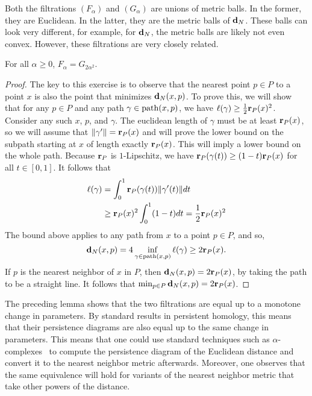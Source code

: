     Both the filtrations $(F_\alpha)$ and $(G_\alpha)$ are unions of metric balls.
    In the former, they are Euclidean.
    In the latter, they are the metric balls of $\mathbf{d}_N$.
    These balls can look very different, for example, for $\mathbf{d}_N$, the metric balls are likely not even convex.
    However, these filtrations are very closely related.
    \begin{lemma}
      For all $\alpha \ge 0$, $F_\alpha = G_{2\alpha^2}$.
    \end{lemma}
    \begin{proof}
      The key to this exercise is to observe that the nearest point $p \in P$ to a point $x$ is also the point that minimizes $\mathbf{d}_N(x,p)$.
      To prove this, we will show that for any $p\in P$ and any path $\gamma\in \mathrm{path}(x,p)$, we have $\ell(\gamma)\ge \frac{1}{2}\mathbf{r}_P(x)^2$.
      Consider any such $x$, $p$, and $\gamma$.
      The euclidean length of $\gamma$ must be at least $\mathbf{r}_P(x)$, so we will assume that $\|\gamma'\| = \mathbf{r}_P(x)$ and will prove the lower bound on the subpath starting at $x$ of length exactly $\mathbf{r}_P(x)$.
      This will imply a lower bound on the whole path.
      Because $\mathbf{r}_P$ is $1$-Lipschitz, we have $\mathbf{r}_P(\gamma(t))\ge (1-t)\mathbf{r}_P(x)$ for all $t\in [0,1]$.  It follows that
      \begin{align*}
        \ell(\gamma) &= \int_0^1 \mathbf{r}_P(\gamma(t))\|\gamma'(t)\|dt \\
         &  \ge \mathbf{r}_P(x)^2 \int_0^1 (1-t)dt
          =  \frac{1}{2}\mathbf{r}_P(x)^2
      \end{align*}
      The bound above applies to any path from $x$ to a point $p\in P$, and so,
      \[
        \mathbf{d}_N(x,p) = 4 \inf_{\gamma\in \mathrm{path}(x,p)} \ell(\gamma) \ge 2\mathbf{r}_P(x).
      \]
      If $p$ is the nearest neighbor of $x$ in $P$, then $\mathbf{d}_N(x,p) = 2\mathbf{r}_P(x)$, by taking the path to be a straight line.
      It follows that $\min_{p\in P}\mathbf{d}_N(x,p) = 2\mathbf{r}_P(x)$.
    \end{proof}

    The preceding lemma shows that the two filtrations are equal up to a monotone change in parameters.
    By standard results in persistent homology, this means that their persistence diagrams are also equal up to the same change in parameters.
    This means that one could use standard techniques such as $\alpha$-complexes~\cite{edelsbrunner02topological} to compute the persistence diagram of the Euclidean distance and convert it to the nearest neighbor metric afterwards.
    Moreover, one observes that the same equivalence will hold for variants of the nearest neighbor metric that take other powers of the distance.

